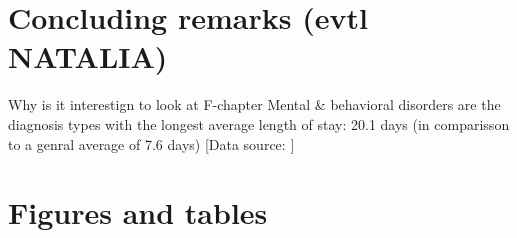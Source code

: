 \documentclass[11pt, a4paper]{article} %
\begin{document}
\section{Concluding remarks (evtl NATALIA)}\label{sec:conclusion}

Why is it interestign to look at F-chapter
Mental \& behavioral disorders are the diagnosis types with the longest average length of stay: 20.1 days (in comparisson to a genral average of 7.6 days) [Data source: \cite[p. 5]{statistisches2012diagnosedaten} ]






\newpage






\newpage
\section{Figures and tables}

\end{document}
